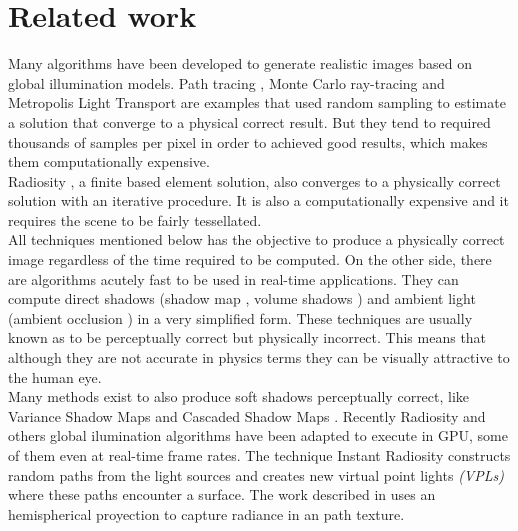 \documentclass[10pt, conference]{IEEEtran}
\begin{document}
\section{Related work}
%
Many algorithms have been developed to generate realistic images based on global illumination models. 
Path tracing \cite{The_rendering_equation}, Monte Carlo ray-tracing \cite{Montecarlo_Ray_tracing} and Metropolis Light Transport \cite{Metropolis_light_transport} are examples that used random sampling to 
estimate a solution that converge to a physical correct result. But they tend to required thousands of samples per pixel in order to 
achieved good results, which makes them computationally expensive.\\

Radiosity \cite{radiosity}, a finite based element solution, also converges to a physically correct solution with an iterative procedure. 
It is also a computationally expensive and it requires the scene to be fairly tessellated.\\ 

All techniques mentioned below has the objective to produce a physically correct image regardless of the time required to be computed.
On the other side, there are algorithms acutely fast to be used in real-time applications. 
They can compute direct shadows (shadow map \cite{shadow_map}, volume shadows \cite{real_time_shadows}) and ambient light (ambient occlusion \cite{ambient_occlusion}) 
in a very simplified form. These techniques are usually known as to be perceptually correct but physically incorrect. 
This means that although they are not accurate in physics terms they can be visually attractive to the human eye.\\

Many methods exist to also produce soft shadows perceptually correct, like Variance Shadow Maps \cite{shadow_map} and Cascaded Shadow Maps \cite{real_time_shadows}.
Recently Radiosity and others global ilumination algorithms have been adapted to execute in GPU, some of them even at real-time frame rates.
The technique Instant Radiosity \cite{instant_radiosity} constructs random paths from the light sources and creates new virtual point lights \emph{(VPLs)} where these paths encounter a surface.
The work described in \cite{gpu_gems_2} uses an hemispherical proyection to capture radiance in an path texture.





\end{document}
